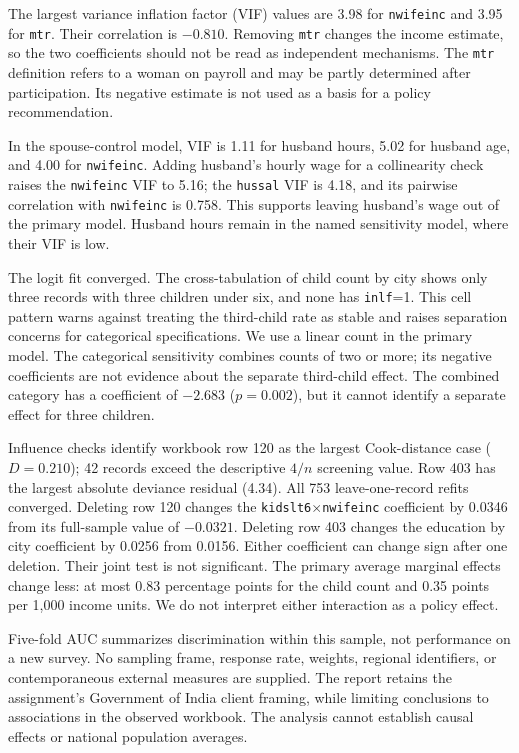 \documentclass[conference]{IEEEtran}
\begin{document}
The largest variance inflation factor (VIF) values are 3.98 for \texttt{nwifeinc} and 3.95 for \texttt{mtr}. Their correlation is $-0.810$. Removing \texttt{mtr} changes the income estimate, so the two coefficients should not be read as independent mechanisms. The \texttt{mtr} definition refers to a woman on payroll and may be partly determined after participation. Its negative estimate is not used as a basis for a policy recommendation.

In the spouse-control model, VIF is 1.11 for husband hours, 5.02 for husband age, and 4.00 for \texttt{nwifeinc}. Adding husband's hourly wage for a collinearity check raises the \texttt{nwifeinc} VIF to 5.16; the \texttt{hussal} VIF is 4.18, and its pairwise correlation with \texttt{nwifeinc} is 0.758. This supports leaving husband's wage out of the primary model. Husband hours remain in the named sensitivity model, where their VIF is low.

The logit fit converged. The cross-tabulation of child count by city shows only three records with three children under six, and none has \texttt{inlf}=1. This cell pattern warns against treating the third-child rate as stable and raises separation concerns for categorical specifications. We use a linear count in the primary model. The categorical sensitivity combines counts of two or more; its negative coefficients are not evidence about the separate third-child effect. The combined category has a coefficient of $-2.683$ ($p=0.002$), but it cannot identify a separate effect for three children.

Influence checks identify workbook row 120 as the largest Cook-distance case ($D=0.210$); 42 records exceed the descriptive $4/n$ screening value. Row 403 has the largest absolute deviance residual (4.34). All 753 leave-one-record refits converged. Deleting row 120 changes the \texttt{kidslt6}$\times$\texttt{nwifeinc} coefficient by 0.0346 from its full-sample value of $-0.0321$. Deleting row 403 changes the education by city coefficient by 0.0256 from 0.0156. Either coefficient can change sign after one deletion. Their joint test is not significant. The primary average marginal effects change less: at most 0.83 percentage points for the child count and 0.35 points per 1,000 income units. We do not interpret either interaction as a policy effect.

Five-fold AUC summarizes discrimination within this sample, not performance on a new survey. No sampling frame, response rate, weights, regional identifiers, or contemporaneous external measures are supplied. The report retains the assignment's Government of India client framing, while limiting conclusions to associations in the observed workbook. The analysis cannot establish causal effects or national population averages.
\end{document}
